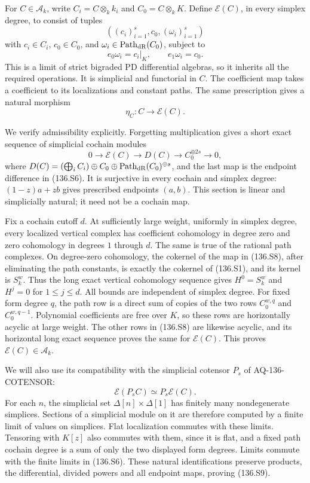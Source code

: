 For $C\in\mathcal A_k$, write $C_i=C\otimes_k k_i$
and $C_0=C\otimes_k K$. Define $\mathcal E(C)$,
in every simplex degree, to consist of tuples
\[
       ((c_i)_{i=1}^s,c_0,(\omega_i)_{i=1}^s)
\]
with $c_i\in C_i$, $c_0\in C_0$, and
$\omega_i\in\operatorname{Path}_{\rm dR}(C_0)$,
subject to
\[
                       e_0\omega_i=c_i|_K,
             \qquad    e_1\omega_i=c_0.                   \tag{136.S6}
\]
This is a limit of strict bigraded PD differential
algebras, so it inherits all the required operations.
It is simplicial and functorial in $C$. The coefficient
map takes a coefficient to its localizations and
constant paths. The same prescription gives a natural
morphism
\[
                            \eta_C:C\longrightarrow\mathcal E(C).
                                                               \tag{136.S7}
\]

We verify admissibility explicitly. Forgetting
multiplication gives a short exact sequence of
simplicial cochain modules
\[
0\longrightarrow\mathcal E(C)\longrightarrow D(C)
 \longrightarrow C_0^{\oplus 2s}\longrightarrow0,          \tag{136.S8}
\]
where
$D(C)=(\bigoplus_i C_i)\oplus C_0
\oplus\operatorname{Path}_{\rm dR}(C_0)^{\oplus s}$,
and the last map is the endpoint difference in
(136.S6). It is surjective in every cochain and
simplex degree: $(1-z)a+zb$ gives prescribed
endpoints $(a,b)$. This section is linear and
simplicially natural; it need not be a cochain map.

Fix a cochain cutoff $d$. At sufficiently large weight,
uniformly in simplex degree, every localized vertical
complex has coefficient cohomology in degree zero
and zero cohomology in degrees $1$ through $d$.
The same is true of the rational path complexes.
On degree-zero cohomology, the cokernel of the map
in (136.S8), after eliminating the path constants,
is exactly the cokernel of (136.S1), and its kernel
is $S_k^w$. Thus the long exact vertical cohomology
sequence gives $H^0=S_k^w$ and $H^j=0$ for
$1\le j\le d$. All bounds are independent of
simplex degree. For fixed form degree $q$, the
path row is a direct sum of copies of the two rows
$C_0^{w,q}$ and $C_0^{w,q-1}$. Polynomial coefficients
are free over $K$, so these rows are horizontally
acyclic at large weight. The other rows in (136.S8)
are likewise acyclic, and its horizontal long exact
sequence proves the same for $\mathcal E(C)$.
This proves $\mathcal E(C)\in\mathcal A_k$.

We will also use its compatibility with the simplicial
cotensor $P_s$ of AQ-136-COTENSOR:
\[
                     \mathcal E(P_s C)\simeq P_s\mathcal E(C).
                                                               \tag{136.S9}
\]
For each $n$, the simplicial set $\Delta[n]\times\Delta[1]$
has finitely many nondegenerate simplices. Sections of
a simplicial module on it are therefore computed by
a finite limit of values on simplices. Flat localization
commutes with these limits. Tensoring with $K[z]$ also
commutes with them, since it is flat, and a fixed path
cochain degree is a sum of only the two displayed
form degrees. Limits commute with the finite limits
in (136.S6). These natural identifications preserve
products, the differential, divided powers and all
endpoint maps, proving (136.S9).

